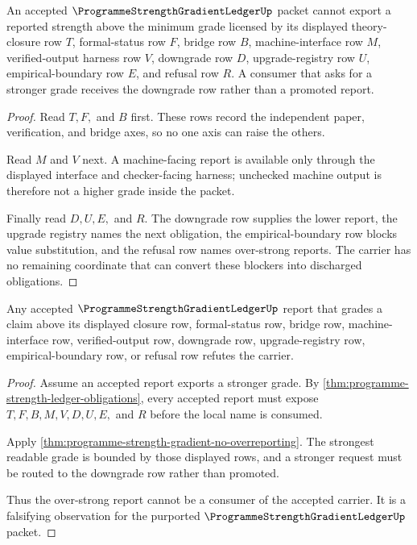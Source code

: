 \begin{theorem}
\label{thm:programme-strength-gradient-no-overreporting}
An accepted $\ProgrammeStrengthGradientLedgerUp$ packet cannot export a reported strength above the minimum grade licensed by its displayed theory-closure row $T$, formal-status row $F$, bridge row $B$, machine-interface row $M$, verified-output harness row $V$, downgrade row $D$, upgrade-registry row $U$, empirical-boundary row $E$, and refusal row $R$. A consumer that asks for a stronger grade receives the downgrade row rather than a promoted report.
\end{theorem}
\begin{proof}
Read $T,F,$ and $B$ first. These rows record the independent paper, verification, and bridge axes, so no one axis can raise the others.

Read $M$ and $V$ next. A machine-facing report is available only through the displayed interface and checker-facing harness; unchecked machine output is therefore not a higher grade inside the packet.

Finally read $D,U,E,$ and $R$. The downgrade row supplies the lower report, the upgrade registry names the next obligation, the empirical-boundary row blocks value substitution, and the refusal row names over-strong reports. The carrier has no remaining coordinate that can convert these blockers into discharged obligations.
\end{proof}

\begin{theorem}
\label{thm:programme-strength-ledger-falsifiable-prediction}
Any accepted $\ProgrammeStrengthGradientLedgerUp$ report that grades a claim above its displayed closure row, formal-status row, bridge row, machine-interface row, verified-output row, downgrade row, upgrade-registry row, empirical-boundary row, or refusal row refutes the carrier.
\end{theorem}
\begin{proof}
Assume an accepted report exports a stronger grade. By \autoref{thm:programme-strength-ledger-obligations}, every accepted report must expose $T,F,B,M,V,D,U,E,$ and $R$ before the local name is consumed.

Apply \autoref{thm:programme-strength-gradient-no-overreporting}. The strongest readable grade is bounded by those displayed rows, and a stronger request must be routed to the downgrade row rather than promoted.

Thus the over-strong report cannot be a consumer of the accepted carrier. It is a falsifying observation for the purported $\ProgrammeStrengthGradientLedgerUp$ packet.
\end{proof}

